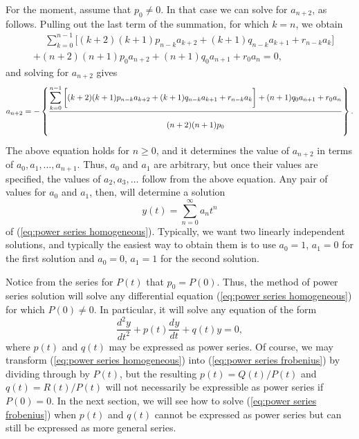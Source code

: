 \documentclass{myart}
\newcommand{\eq}[1]{(\ref{eq:#1})}
\newcommand{\deriv}[3][]{\frac{d^{#1}#2}{d#3^{#1}}}
\begin{document}
For the moment, assume that $p_0 \neq 0$. In that case we can solve for $a_{n+2}$, as follows. Pulling out the last term of the summation, for which $k = n$, we obtain
\begin{align*}
&\phantom{{}+{}} \sum_{k=0}^{n-1} \bigg[(k+2)(k+1) p_{n-k} a_{k+2} + (k+1) q_{n-k} a_{k+1} + r_{n-k} a_k\bigg] \\
&+ (n+2)(n+1) p_0 a_{n+2} + (n+1) q_0 a_{n+1} + r_0 a_n = 0,
\end{align*}
and solving for $a_{n+2}$ gives
\begin{equation*}
a_{n+2} = -\left\{\frac{\displaystyle \sum_{k=0}^{n-1} \bigg[(k+2)(k+1) p_{n-k} a_{k+2} + (k+1) q_{n-k} a_{k+1} + r_{n-k} a_k\bigg] + (n+1) q_0 a_{n+1} + r_0 a_n}{\displaystyle \vphantom{\sum_0^0}(n+2)(n+1)p_0}\right\}.
\end{equation*}
The above equation holds for $n \geq 0$, and it determines the value of $a_{n+2}$ in terms of $a_0, a_1, \ldots, a_{n+1}$. Thus, $a_0$ and $a_1$ are arbitrary, but once their values are specified, the values of $a_2, a_3, \ldots$ follow from the above equation. Any pair of values for $a_0$ and $a_1$, then, will determine a solution
\begin{equation*}
y(t) = \sum_{n=0}^\infty a_n t^n
\end{equation*}
of \eq{power series homogeneous}. Typically, we want two linearly independent solutions, and typically the easiest way to obtain them is to use $a_0 = 1$, $a_1 = 0$ for the first solution and $a_0 = 0$, $a_1 = 1$ for the second solution.

Notice from the series for $P(t)$ that $p_0 = P(0)$. Thus, the method of power series solution will solve any differential equation \eq{power series homogeneous} for which $P(0) \neq 0$. In particular, it will solve any equation of the form
\begin{equation} \label{eq:power series frobenius}
\deriv[2]{y}{t} + p(t) \deriv{y}{t} + q(t) y = 0,
\end{equation}
where $p(t)$ and $q(t)$ may be expressed as power series. Of course, we may transform \eq{power series homogeneous} into \eq{power series frobenius} by dividing through by $P(t)$, but the resulting $p(t) = Q(t)/P(t)$ and $q(t) = R(t)/P(t)$ will not necessarily be expressible as power series if $P(0) = 0$. In the next section, we will see how to solve \eq{power series frobenius} when $p(t)$ and $q(t)$ cannot be expressed as power series but can still be expressed as more general series.
\end{document}
